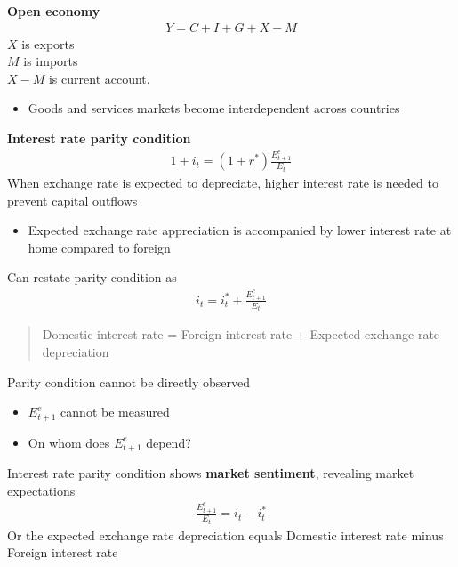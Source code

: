 \documentclass{beamer}
\begin{document}
\begin{frame}
  \textbf{Open economy}  
  \begin{align}
    Y=C+I+G+X-M
  \end{align}
  $X$ is exports\\
  $M$ is imports\\
  $X-M$ is current account.  
  \begin{itemize}
    \item Goods and services markets become interdependent across countries
  \end{itemize}
\end{frame}

\begin{frame}
  \textbf{Interest rate parity condition}
  \begin{align}
    1+i_t = (1+r^*) \frac{E^e_{t+1}}{E_t}
  \end{align}
  When exchange rate is expected to depreciate, higher interest rate is needed to prevent capital outflows
  \begin{itemize}
    \item Expected exchange rate appreciation is accompanied by lower interest rate at home compared to foreign
  \end{itemize}  
\end{frame}

\begin{frame}
  Can restate parity condition as
  \begin{align}
    i_t = i^*_t +  \frac{E^e_{t+1}}{E_t}
  \end{align}
  \begin{quote}
    Domestic interest rate = Foreign interest rate + Expected exchange rate depreciation
  \end{quote}
  Parity condition cannot be directly observed
  \begin{itemize}
    \item $E^e_{t+1}$ cannot be measured
    \item On whom does $E^e_{t+1}$ depend? 
  \end{itemize}
  Interest rate parity condition shows \textbf{market sentiment}, revealing market expectations
  \begin{align}
      \frac{E^e_{t+1}}{E_t} = i_t - i^*_t 
  \end{align} 
  Or the expected exchange rate depreciation equals Domestic interest rate minus Foreign interest rate
\end{frame}
\end{document}
